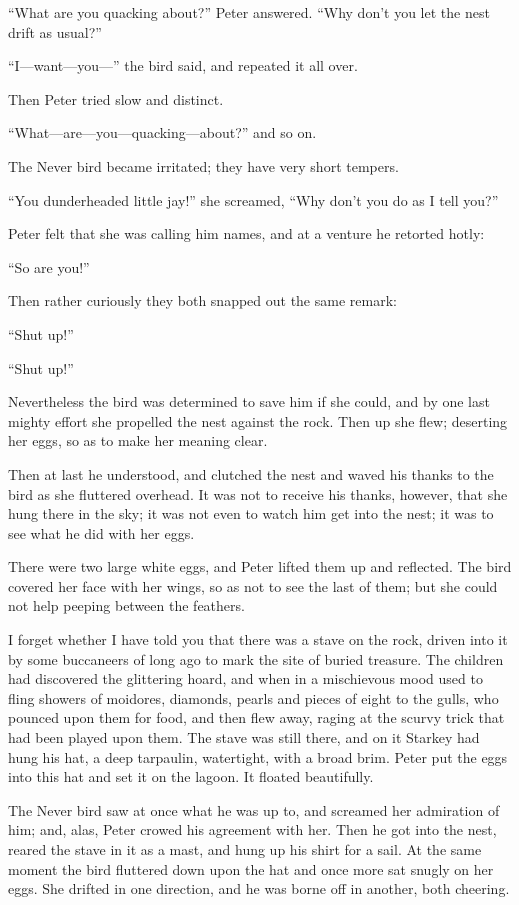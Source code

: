 ``What are you quacking about?'' Peter answered. ``Why don't you let the
nest drift as usual?''

``I---want—you—'' the bird said, and repeated it all over.

Then Peter tried slow and distinct.

``What---are—you—quacking—about?'' and so on.

The Never bird became irritated; they have very short tempers.

``You dunderheaded little jay!'' she screamed, ``Why don't you do as I
tell you?''

Peter felt that she was calling him names, and at a venture he retorted
hotly:

``So are you!''

Then rather curiously they both snapped out the same remark:

``Shut up!''

``Shut up!''

Nevertheless the bird was determined to save him if she could, and by
one last mighty effort she propelled the nest against the rock. Then up
she flew; deserting her eggs, so as to make her meaning clear.

Then at last he understood, and clutched the nest and waved his thanks
to the bird as she fluttered overhead. It was not to receive his
thanks, however, that she hung there in the sky; it was not even to
watch him get into the nest; it was to see what he did with her eggs.

There were two large white eggs, and Peter lifted them up and
reflected. The bird covered her face with her wings, so as not to see
the last of them; but she could not help peeping between the feathers.

I forget whether I have told you that there was a stave on the rock,
driven into it by some buccaneers of long ago to mark the site of
buried treasure. The children had discovered the glittering hoard, and
when in a mischievous mood used to fling showers of moidores, diamonds,
pearls and pieces of eight to the gulls, who pounced upon them for
food, and then flew away, raging at the scurvy trick that had been
played upon them. The stave was still there, and on it Starkey had hung
his hat, a deep tarpaulin, watertight, with a broad brim. Peter put the
eggs into this hat and set it on the lagoon. It floated beautifully.

The Never bird saw at once what he was up to, and screamed her
admiration of him; and, alas, Peter crowed his agreement with her. Then
he got into the nest, reared the stave in it as a mast, and hung up his
shirt for a sail. At the same moment the bird fluttered down upon the
hat and once more sat snugly on her eggs. She drifted in one direction,
and he was borne off in another, both cheering.

